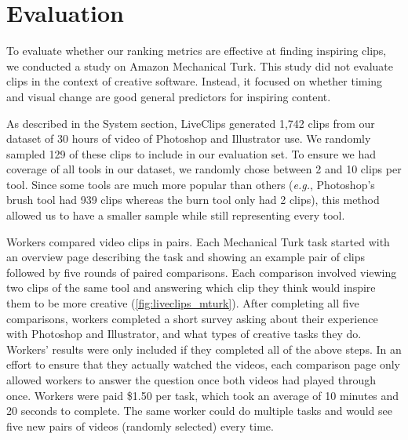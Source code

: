 \section{Evaluation}
To evaluate whether our ranking metrics are effective at finding inspiring clips, we conducted a study on Amazon Mechanical Turk. This study did not evaluate clips in the context of creative software. Instead, it focused on whether timing and visual change are good general predictors for inspiring content. 

As described in the System section, LiveClips generated 1,742 clips from our dataset of 30 hours of video of Photoshop and Illustrator use. We randomly sampled 129 of these clips to include in our evaluation set. To ensure we had coverage of all tools in our dataset, we randomly chose between 2 and 10 clips per tool. Since some tools are much more popular than others (\textit{e.g.}, Photoshop's brush tool had 939 clips whereas the burn tool only had 2 clips), this method allowed us to have a smaller sample while still representing every tool.

Workers compared video clips in pairs. Each Mechanical Turk task started with an overview page describing the task and showing an example pair of clips followed by five rounds of paired comparisons. Each comparison involved viewing two clips of the same tool and answering which clip they think would inspire them to be more creative (\autoref{fig:liveclips_mturk}). After completing all five comparisons, workers completed a short survey asking about their experience with Photoshop and Illustrator, and what types of creative tasks they do. Workers' results were only included if they completed all of the above steps. In an effort to ensure that they actually watched the videos, each comparison page only allowed workers to answer the question once both videos had played through once. Workers were paid \$1.50 per task, which took an average of 10 minutes and 20 seconds to complete. The same worker could do multiple tasks and would see five new pairs of videos (randomly selected) every time.

